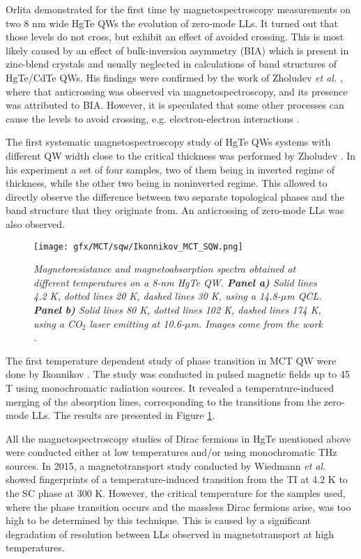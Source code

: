 \documentclass[titlepage,a4paper]{book}
\begin{document}
Orlita \cite{Orlita_MCT_QW} demonstrated for the first time by magnetospectroscopy measurements on two 8 nm wide HgTe QWs the evolution of zero-mode LLs. It turned out that those levels do not cross, but exhibit an effect of avoided crossing. This is most likely caused by an effect of bulk-inversion asymmetry (BIA) which is present in zinc-blend crystals and usually neglected in calculations of band structures of HgTe/CdTe QWs. His findings were confirmed by the work of Zholudev \textit{et al.} \cite{Zholudev_MCT_QW_anticrossing}, where that anticrossing was observed via magnetospectroscopy, and its presence was attributed to BIA. However, it is speculated that some other processes can cause the levels to avoid crossing, e.g. electron-electron interactions \cite{Orlita_MCT_QW}.

The first systematic magnetospectroscopy study of HgTe QWs systems with different QW width close to the critical thickness was performed by Zholudev \cite{Zholudev_MCT_QW}. In his experiment a set of four samples, two of them being in inverted regime of thickness, while the other two being in noninverted regime. This allowed to directly observe the difference between two separate topological phases and the band structure that they originate from. An anticrossing of zero-mode LLs was also observed.
\begin{figure}[ht]
	\centering
	\texttt{[image: gfx/MCT/sqw/Ikonnikov\_MCT\_SQW.png]}
	\vspace{-10pt}
	\caption{\textit{Magnetoresistance and magnetoabsorption spectra obtained at different temperatures on a 8-nm HgTe QW. \textbf{Panel a)} Solid lines 4.2 K, dotted lines 20 K, dashed lines 30 K, using a 14.8-$\mu$m QCL. \textbf{Panel b)} Solid lines 80 K, dotted lines 102 K, dashed lines 174 K, using a CO$_2$ laser emitting at 10.6-$\mu$m. Images come from the work \cite{Ikonnikov_MCT_SQW}.}}
	\label{fig:Ikonnikov_MCT_SQW}
\end{figure}

The first temperature dependent study of phase transition in MCT QW were done by Ikonnikov \cite{Ikonnikov_MCT_SQW}. The study was conducted in pulsed magnetic fields up to 45 T using monochromatic radiation sources. It revealed a temperature-induced merging of the absorption lines, corresponding to the transitions from the zero-mode LLs. The results are presented in Figure \ref{fig:Ikonnikov_MCT_SQW}.

All the magnetospectroscopy studies of Dirac fermions in HgTe mentioned above were conducted either at low temperatures and/or using monochromatic THz sources. In 2015, a magnetotransport study conducted by Wiedmann \textit{et al.} \cite{Wiedmann_State} showed fingerprints of a temperature-induced transition from the TI at 4.2 K to the SC phase at 300 K. However, the critical temperature for the samples used, where the phase transition occurs and the massless Dirac fermions arise, was too high to be determined by this technique. This is caused by a significant degradation of resolution between LLs observed in magnetotransport at high temperatures.
\end{document}
